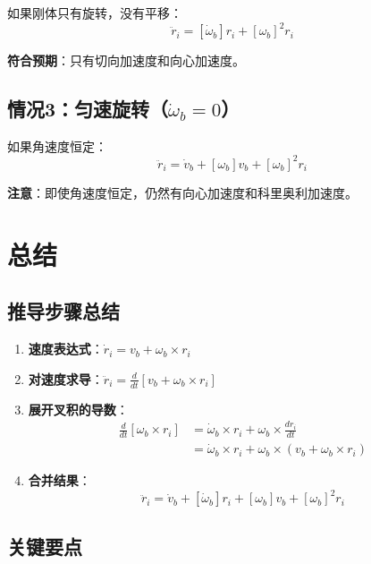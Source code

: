 \documentclass[12pt,a4paper]{article}
\begin{document}
如果刚体只有旋转，没有平移：
\begin{equation}
\ddot{r}_i = [\dot{\omega}_b] r_i + [\omega_b]^2 r_i
\end{equation}

\textbf{符合预期}：只有切向加速度和向心加速度。

\subsection{情况3：匀速旋转（$\dot{\omega}_b = 0$）}

如果角速度恒定：
\begin{equation}
\ddot{r}_i = \dot{v}_b + [\omega_b] v_b + [\omega_b]^2 r_i
\end{equation}

\textbf{注意}：即使角速度恒定，仍然有向心加速度和科里奥利加速度。

\section{总结}

\subsection{推导步骤总结}

\begin{enumerate}
\item \textbf{速度表达式}：$\dot{r}_i = v_b + \omega_b \times r_i$

\item \textbf{对速度求导}：$\ddot{r}_i = \frac{d}{dt}[v_b + \omega_b \times r_i]$

\item \textbf{展开叉积的导数}：
\begin{align}
\frac{d}{dt}[\omega_b \times r_i] &= \dot{\omega}_b \times r_i + \omega_b \times \frac{dr_i}{dt} \\
&= \dot{\omega}_b \times r_i + \omega_b \times (v_b + \omega_b \times r_i)
\end{align}

\item \textbf{合并结果}：
\begin{equation}
\ddot{r}_i = \dot{v}_b + [\dot{\omega}_b] r_i + [\omega_b] v_b + [\omega_b]^2 r_i
\end{equation}
\end{enumerate}

\subsection{关键要点}
\end{document}

